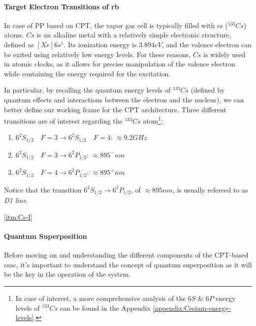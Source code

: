 \paragraph{Target Electron Transitions of \acrfull{rb}}

In case of PP based on CPT, the vapor gas cell is typically filled with \acrfull{cs} ($^{133}Cs$) atoms.
$Cs$ is an alkaline metal with a relatively simple electronic structure, defined as $[Xe]6s^1$.
Its ionization energy is $3.894 eV$, and the valence electron can be exited using relatively low energy levels.
For these reasons, $Cs$ is widely used in atomic clocks, as it allows for precise manipulation of the valence electron while containing the energy required for the excitation.

In particular, by recalling the quantum energy levels of $^{133}Cs$ (defined by quantum effects and interactions between the electron and the nucleus), we can better define our working frame for the CPT architecture.
Three different transitions are of interest regarding the $^{133}Cs$ atom\footnote{In case of interest, a more comprehensive analysis of the $6S$ \& $6P$ energy levels of $^{133}Cs$ can be found in the Appendix \ref{appendix:Cesium-energy-levels}.}:

\begin{enumerate}[label = Cs.\Roman*, ref = Cs.\Roman*, leftmargin = *]
    \item \label{itm:Cs-I} $6^2S_{1/2} \quad F=3 \rightarrow 6^2S_{1/2} \quad F=4$: $\approx 9.2GHz$
    \item \label{itm:Cs-II} $6^2S_{1/2} \quad F=3 \rightarrow 6^2P_{1/2}$: $\approx 895^{-}nm$
    \item \label{itm:Cs-III} $6^2S_{1/2} \quad F=4 \rightarrow 6^2P_{1/2}$: $\approx 895^{+}nm$
\end{enumerate}

Notice that the transition $6^2S_{1/2} \rightarrow 6^2P_{1/2}$, of $\approx 895nm$, is usually refereed to as \textit{D1 line}.

\ref{itm:Cs-I}

\paragraph{Quantum Superposition}

Before moving on and understanding the different components of the CPT-based \acrshort{csac}, it's important to understand the concept of quantum superposition as it will be the key in the operation of the system.


